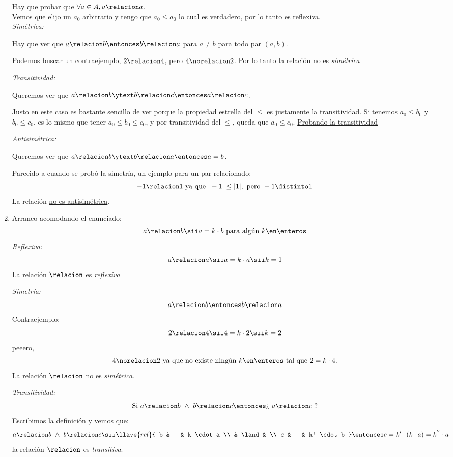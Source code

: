 \begin{enumerate}[label=\roman*)]
        Hay que probar que $\forall a \in A, a \relacion a$. \\
        Vemos que elijo un $a_0$ arbitrario y tengo que $a_0 \leq a_0$ lo cual es verdadero, por lo tanto \underline{es reflexiva}. \\

        \textit{Simétrica: }

        Hay que ver que $a \relacion b \entonces b \relacion a$ para $a\neq b$ para todo par $(a,b)$.

        Podemos buscar un contraejemplo, $2 \relacion 4$, pero $4 \norelacion 2$. Por lo tanto la relación
        no es \textit{simétrica}

        \textit{Transitividad: }

        Queremos ver que $a \relacion b \ytext b \relacion c \entonces a \relacion c$.

        Justo en este caso es bastante sencillo de ver porque la propiedad estrella del $\leq$ es justamente la transitividad.
        Si tenemos $a_0 \leq b_0$ y $b_0 \leq c_0$, es lo mismo que tener $a_0 \leq b_0 \leq c_0$, y por transitividad del $\leq$,
        queda que $a_0 \leq c_0$. \underline{Probando la transitividad}

        \textit{Antisimétrica: }

        Queremos ver que $a \relacion b \ytext b \relacion a \entonces a = b$.

        Parecido a cuando se probó la simetría, un ejemplo para un par relacionado:
        $$
          -1 \relacion 1 \text{ ya que } |-1| \leq |1|, \text{ pero } -1 \distinto 1
        $$
        La relación \ul{no es antisimétrica}.

  \item Arranco acomodando el enunciado:
        $$
          a \relacion b \sii a = k \cdot b ~ \text{para algún} ~ k \en \enteros
        $$
        \textit{Reflexiva:}
        $$
          a \relacion a \sii a = k \cdot a \sii k = 1
        $$
        La relación $\relacion$ es \textit{reflexiva}

        \textit{Simetría:}
        $$
          a \relacion b \entonces b \relacion a
        $$
        Contraejemplo:
        $$
          2 \relacion 4 \sii 4 = k \cdot 2 \sii  k = 2
        $$
        peeero,
        $$
          4 \norelacion 2  ~ \text{ya que no existe ningún} ~  k \en \enteros ~ \text{tal que} ~  2 = k \cdot 4.
        $$
        La relación $\relacion$ no es \textit{simétrica}.

        \textit{Transitividad:}
        $$
          \text{Si} ~ a \relacion b  ~ \land ~  b \relacion c \entonces \text{¿}~ a \relacion c ~\text{?}
        $$
        Escribimos la definición y vemos que:
        $$
          a \relacion b ~ \land  ~ b \relacion c
          \sii
          \llave{rcl}{
            b & = & k \cdot a \\
            & \land & \\
            c & = & k' \cdot b
          }
          \entonces c = k' \cdot ( k \cdot a) =k^{''} \cdot a
        $$
        la relación $\relacion$ es \textit{transitiva}.


\end{enumerate}
